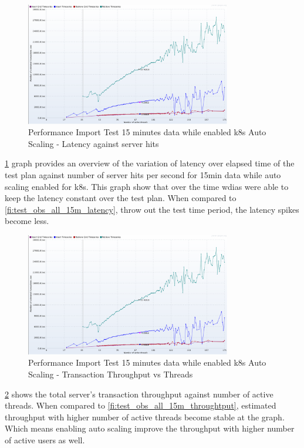 \begin{figure}[htp]
    \centering
    \includegraphics[width=0.8\textwidth]{results/obs/all_auto/obs_all_auto_15m_transaction_throughtput_vs_threads.png}
    \caption{Performance Import Test 15 minutes data while enabled \acrshort{k8s} Auto Scaling - Latency against server hits}
    \label{fi:test_obs_all_auto_15m_latency}
\end{figure}
\ref{fi:test_obs_all_auto_15m_latency} graph provides an overview of the variation of latency over elapsed time of the test plan against number of server hits per second for 15min data while auto scaling enabled for \acrshort{k8s}.
This graph show that over the time \acrshort{wdias} were able to keep the latency constant over the test plan.
When compared to \ref{fi:test_obs_all_15m_latency}, throw out the test time period, the latency spikes become less.

\begin{figure}[htp]
    \centering
    \includegraphics[width=0.8\textwidth]{results/obs/all_auto/obs_all_auto_15m_transaction_throughtput_vs_threads.png}
    \caption{Performance Import Test 15 minutes data while enabled \acrshort{k8s} Auto Scaling - Transaction Throughput vs Threads}
    \label{fi:test_obs_all_auto_15m_throughtput}
\end{figure}
\ref{fi:test_obs_all_auto_15m_throughtput} shows the total server's transaction throughput against number of active threads.
When compared to \ref{fi:test_obs_all_15m_throughtput}, estimated throughput with higher number of active threads become stable at the graph. Which means enabling auto scaling improve the throughput with higher number of active users as well.

